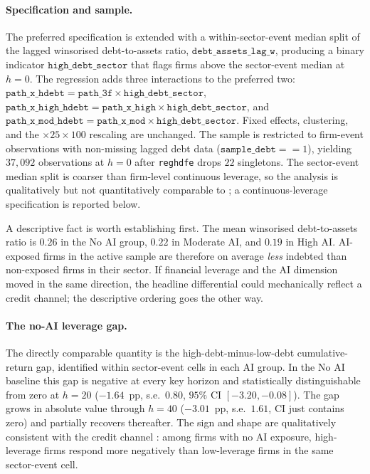 \paragraph{Specification and sample.} The preferred specification is
extended with a within-sector-event median split of the lagged
winsorised debt-to-assets ratio, $\texttt{debt\_assets\_lag\_w}$,
producing a binary indicator $\texttt{high\_debt\_sector}$ that
flags firms above the sector-event median at $h = 0$. The regression
adds three interactions to the preferred two:
$\texttt{path\_x\_hdebt} = \texttt{path\_3f} \times
\texttt{high\_debt\_sector}$, $\texttt{path\_x\_high\_hdebt} =
\texttt{path\_x\_high} \times \texttt{high\_debt\_sector}$, and
$\texttt{path\_x\_mod\_hdebt} = \texttt{path\_x\_mod} \times
\texttt{high\_debt\_sector}$. Fixed effects, clustering, and the
$\times 25 \times 100$ rescaling are unchanged. The sample is
restricted to firm-event observations with non-missing lagged debt
data ($\texttt{sample\_debt} == 1$), yielding $37{,}092$ observations
at $h = 0$ after \texttt{reghdfe} drops $22$ singletons. The
sector-event median split is coarser than firm-level continuous
leverage, so the analysis is qualitatively but not quantitatively
comparable to \citet{ottonelloWinberry2020}; a continuous-leverage
specification is reported below.
 
A descriptive fact is worth establishing first. The mean winsorised
debt-to-assets ratio is $0.26$ in the No AI group, $0.22$ in
Moderate AI, and $0.19$ in High AI. AI-exposed firms in the active
sample are therefore on average \emph{less} indebted than non-exposed
firms in their sector. If financial leverage and the AI dimension
moved in the same direction, the headline differential could
mechanically reflect a credit channel; the descriptive ordering goes
the other way.
 
\paragraph{The no-AI leverage gap.} The directly comparable quantity
is the high-debt-minus-low-debt cumulative-return gap, identified
within sector-event cells in each AI group. In the No AI baseline
this gap is negative at every key horizon and statistically
distinguishable from zero at $h = 20$ ($-1.64$~pp, s.e.~$0.80$,
$95\%$ CI $[-3.20, -0.08]$). The gap grows in absolute value through
$h = 40$ ($-3.01$~pp, s.e.~$1.61$, CI just contains zero) and
partially recovers thereafter. The sign and shape are qualitatively
consistent with the credit channel \citep{ottonelloWinberry2020}:
among firms with no AI exposure, high-leverage firms respond more
negatively than low-leverage firms in the same sector-event cell.
 
